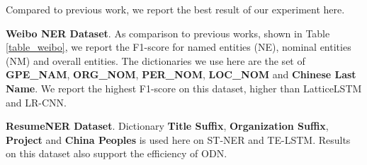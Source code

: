 \documentclass[letterpaper]{article} %
\begin{document}
\begin{table}[t]
\caption{Main Results on Sogou MusicNER.}\smallskip
\centering
{}
\label{table_sogou}
\end{table}

\begin{table}[t]
\caption{Main Results on CoNLL 2003.}\smallskip
\centering
{}
\label{table_conll}
\end{table}



Compared to previous work, we report the best result of our experiment here.

\textbf{Weibo NER Dataset}. As comparison to previous works, shown in Table \ref{table_weibo}, we report the F1-score for named entities (NE), nominal  entities (NM) and overall entities. The dictionaries we use here are the set of \textbf{GPE\_NAM}, \textbf{ORG\_NOM}, \textbf{PER\_NOM}, \textbf{LOC\_NOM} and \textbf{Chinese Last Name}. We report the highest F1-score on this dataset, higher than LatticeLSTM and LR-CNN.

\textbf{ResumeNER Dataset}. Dictionary \textbf{Title Suffix}, \textbf{Organization Suffix}, \textbf{Project} and \textbf{China Peoples} is used here on ST-NER and TE-LSTM. Results on this dataset also support the efficiency of ODN.
\end{document}
